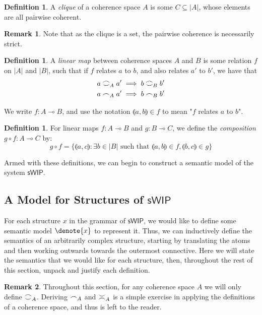 \documentclass[11pt, oneside]{article}
\theoremstyle{plain}
\theoremstyle{definition}
\newtheorem{definition}[theorem]{Definition}
\newtheorem*{remark}{Remark}
\DeclarePairedDelimiter\denote\llbracket\rrbracket
\newcommand{\lp}{\llparenthesis}
\newcommand{\rp}{\rrparenthesis}
\newcommand{\sSys}{{\mathsf{sWIP}}}%
\newcommand{\coh}[1][]{\mathrel{\vcenter{\offinterlineskip\hbox{$\frown$}\vskip0.2ex\hbox{$\smile$}}_{\ifx\\#1\\\else#1\fi}}}
\newcommand{\incoh}[1][]{\mathrel{\vcenter{\offinterlineskip\hbox{$\smile$}\vskip0.2ex\hbox{$\frown$}}_{\ifx\\#1\\\else#1\fi}}}
\newcommand{\scoh}[1][]{\mathrel{\frown}_{\ifx\\#1\\\else#1\fi}}
\newcommand{\comp}{\mathbin{\circ}}
\begin{document}
\begin{definition}
    A \textit{clique} of a coherence space $A$ is some $C \subseteq |A|$, whose elements are all pairwise coherent.
\end{definition}

\begin{remark}
    Note that as the clique is a set, the pairwise coherence is necessarily strict.
\end{remark}

\begin{definition}
    A \textit{linear map} between coherence spaces $A$ and $B$ is some relation $f$ on $|A|$ and $|B|$,
    such that if $f$ relates $a$ to $b$, and also relates $a'$ to $b'$, we have that
    \begin{align*}
        a \coh[A] a' &\implies b \coh[B] b' \\
        a \scoh[A] a' &\implies b \scoh[B] b'
    \end{align*}

    We write $f:A\multimap B$, and use the notation $\lp a,b\rp\in f$ to mean "$f$ relates $a$ to $b$".
\end{definition}

\begin{definition}
    For linear maps $f:A\multimap B$ and $g:B\multimap C$, we define the \textit{composition} $g\comp f:A\multimap C$ by:
    $$g\comp f = \{\lp a,c\rp:\exists b\in|B|\text{ such that }\lp a,b\rp\in f, \lp b,c\rp\in g\}$$
\end{definition}

Armed with these definitions, we can begin to construct a semantic model of the system $\sSys$.

\subsection{A Model for Structures of $\sSys$}

For each structure $x$ in the grammar of $\sSys$, we would like to define some semantic model $\denote{x}$ to represent it.
Thus, we can inductively define the semantics of an arbitrarily complex structure, starting by translating the atoms and then working outwards towards the outermost connective.
Here we will state the semantics that we would like for each structure, then, throughout the rest of this section, unpack and justify each definition.

\begin{remark}
    Throughout this section, for any coherence space $A$ we will only define $\coh[A]$.
    Deriving $\scoh[A]$ and $\incoh[A]$ is a simple exercise in applying the definitions of a coherence space, and thus is left to the reader.
\end{remark}
\end{document}
